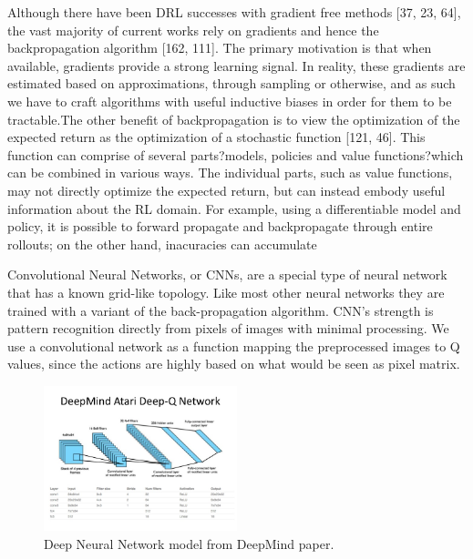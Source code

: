 Although there have been DRL successes with gradient free methods [37, 23, 64], the vast majority of current works rely on gradients and hence the backpropagation algorithm [162, 111]. The primary motivation is that when available, gradients provide a strong learning signal. In reality, these gradients are estimated based on approximations, through sampling or otherwise, and as such we have to craft algorithms with useful inductive biases in order for them to be tractable.The other benefit of backpropagation is to view the optimization of the expected return as the optimization of a stochastic function [121, 46]. This function can comprise of several parts?models, policies and value functions?which can be combined in various ways. The individual parts, such as value functions, may not directly optimize the expected return, but can instead embody useful information about the RL domain. For example, using a differentiable model and policy, it is possible to forward propagate and backpropagate through entire rollouts; on the other hand, inacuracies can accumulate

Convolutional Neural Networks, or CNNs, are a special type of neural network that has a known grid-like topology. Like most other neural networks they are trained with a variant of the back-propagation algorithm. CNN's strength is pattern recognition directly from pixels of images with minimal processing. We use a convolutional network as a function mapping the preprocessed images to Q values, since the actions are highly based on what would be seen as pixel matrix.

\begin{figure}[h]
\centering
\includegraphics[width=0.5\textwidth]{figs/ch4/deepmind-atari-network}
\caption{Deep Neural Network model from DeepMind paper.}
\end{figure}

\vfill
